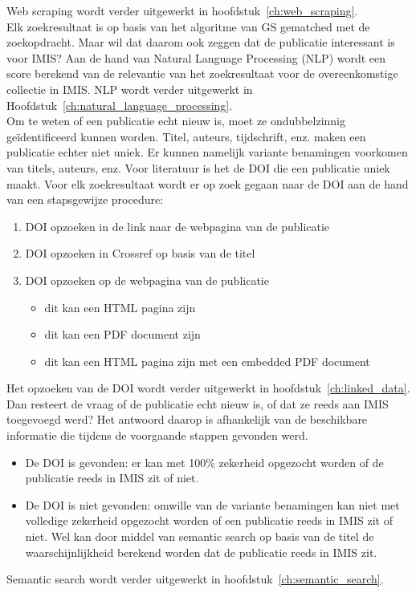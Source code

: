 Web scraping wordt verder uitgewerkt in hoofdstuk~\ref{ch:web_scraping}.\\
Elk zoekresultaat is op basis van het algoritme van GS gematched met de zoekopdracht. Maar wil dat daarom ook zeggen dat de publicatie interessant is voor IMIS? Aan de hand van Natural Language Processing (NLP) wordt een score berekend van de relevantie van het zoekresultaat voor de overeenkomstige collectie in IMIS. NLP wordt verder uitgewerkt in Hoofdstuk~\ref{ch:natural_language_processing}.\\
Om te weten of een publicatie echt nieuw is, moet ze ondubbelzinnig geïdentificeerd kunnen worden. Titel, auteurs, tijdschrift, enz. maken een publicatie echter niet uniek. Er kunnen namelijk variante benamingen voorkomen van titels, auteurs, enz. Voor literatuur is het de DOI die een publicatie uniek maakt. Voor elk zoekresultaat wordt er op zoek gegaan naar de DOI aan de hand van een stapsgewijze procedure:
\begin{enumerate}
    \item DOI opzoeken in de link naar de webpagina van de publicatie
    \item DOI opzoeken in Crossref op basis van de titel
    \item DOI opzoeken op de webpagina van de publicatie
    \begin{itemize}
        \item dit kan een HTML pagina zijn
        \item dit kan een PDF document zijn
        \item dit kan een HTML pagina zijn met een embedded PDF document
    \end{itemize}
\end{enumerate}
Het opzoeken van de DOI wordt verder uitgewerkt in hoofdstuk~\ref{ch:linked_data}.\\
Dan resteert de vraag of de publicatie echt nieuw is, of dat ze reeds aan IMIS toegevoegd werd? Het antwoord daarop is afhankelijk van de beschikbare informatie die tijdens de voorgaande stappen gevonden werd.
\begin{itemize}
    \item De DOI is gevonden: er kan met 100\% zekerheid opgezocht worden of de publicatie reeds in IMIS zit of niet.
    \item De DOI is niet gevonden: omwille van de variante benamingen kan niet met volledige zekerheid opgezocht worden of een publicatie reeds in IMIS zit of niet. Wel kan door middel van semantic search op basis van de titel de waarschijnlijkheid berekend worden dat de publicatie reeds in IMIS zit.
\end{itemize}
Semantic search wordt verder uitgewerkt in hoofdstuk~\ref{ch:semantic_search}.




